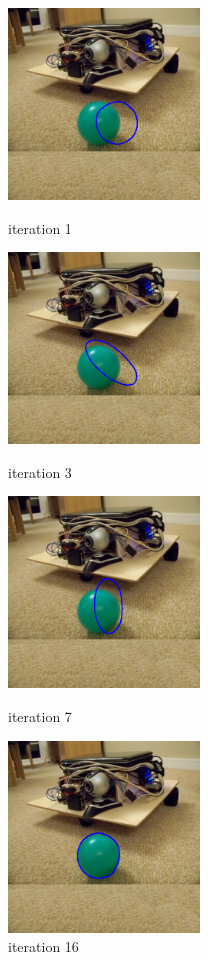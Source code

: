 \begin{figure} 
  \begin{minipage}[t]{0.45\linewidth} 
    \centering 
    \includegraphics[width=2.0in]{images/ball/0.png} 
    \caption{iteration 1} 
    \label{fig:side:a} 
  \end{minipage}%
  \begin{minipage}[t]{0.45\linewidth} 
    \centering 
    \includegraphics[width=2.0in]{images/ball/2.png} 
    \caption{iteration 3} 
    \label{fig:side:b} 
  \end{minipage} 
  \begin{minipage}[t]{0.45\linewidth} 
    \centering 
    \includegraphics[width=2.0in]{images/ball/6.png} 
    \caption{iteration 7} 
    \label{fig:side:c} 
  \end{minipage} 
  \begin{minipage}[t]{0.45\linewidth} 
    \centering 
    \includegraphics[width=2.0in]{images/ball/15.png} 
    \caption{iteration 16} 
    \label{fig:side:d} 
  \end{minipage} 
\end{figure}

